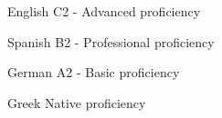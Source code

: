 
\begin{cvskills}

  \cvskill
    {English} %
    {C2 - Advanced proficiency} %

  \cvskill
    {Spanish} %
    {B2 - Professional proficiency} %

  \cvskill
    {German} %
    {A2 - Basic proficiency} %

  \cvskill
    {Greek} %
    {Native proficiency} %

\end{cvskills}
